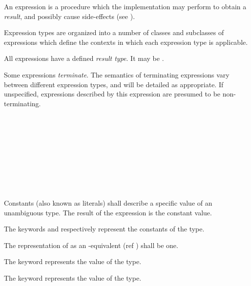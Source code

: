 
\specsubitem
An expression is a procedure which the implementation may perform to obtain a
\textit{result}, and possibly cause side-effects (see
).

\specsubitem
Expression types are organized into a number of classes and subclasses of
expressions which define the contexts in which each expression type is
applicable.

\specsubitem
All expressions have a defined \textit{result type}. It may be .

\specsubitem
Some expressions \textit{terminate}. The semantics of terminating expressions
vary between different expression types, and will be detailed as appropriate.
If unspecified, expressions described by this expression are presumed to be
non-terminating.


\begin{grammar}
 \\
	 \\
	 \\
	 \\
	 \\
	 \\
	 \\
	 \\
\end{grammar}

\specsubitem
Constants (also known as literals) shall describe a specific value of an
unambiguous type. The result of the expression is the constant value.

\specsubitem
The keywords  and  respectively represent
the constants of the  type.

\specsubitem
The representation of  as an -equivalent (ref
) shall be one.

\specsubitem
The  keyword represents the  value of the
 type.

\specsubitem
The  keyword represents the  value of the
 type.


